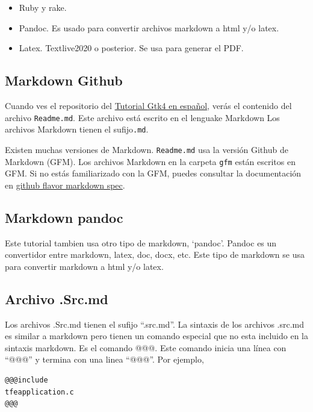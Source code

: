 \begin{itemize}
\tightlist
\item
  Ruby y rake.
\item
  Pandoc. Es usado para convertir archivos markdown a html y/o latex.
\item
  Latex. Textlive2020 o posterior. Se usa para generar el PDF.
\end{itemize}

\hypertarget{markdown-github}{%
\subsection{Markdown Github}\label{markdown-github}}

Cuando ves el repositorio del
\href{https://github.com/cjdg/Gtk4-tutorial-spanish}{Tutorial Gtk4 en
español}, verás el contenido del archivo \texttt{Readme.md}. Este
archivo está escrito en el lenguake Markdown Los archivos Markdown
tienen el sufijo\texttt{.md}.

Existen muchas versiones de Markdown. \texttt{Readme.md} usa la versión
Github de Markdown (GFM). Los archivos Markdown en la carpeta
\texttt{gfm} están escritos en GFM. Si no estás familiarizado con la
GFM, puedes consultar la documentación en
\href{https://github.github.com/gfm/}{github flavor markdown spec}.

\hypertarget{markdown-pandoc}{%
\subsection{Markdown pandoc}\label{markdown-pandoc}}

Este tutorial tambien usa otro tipo de markdown, `pandoc'. Pandoc es un
convertidor entre markdown, latex, doc, docx, etc. Este tipo de markdown
se usa para convertir markdown a html y/o latex.

\hypertarget{archivo-.src.md}{%
\subsection{Archivo .Src.md}\label{archivo-.src.md}}

Los archivos .Src.md tienen el sufijo ``.src.md''. La sintaxis de los
archivos .src.md es similar a markdown pero tienen un comando especial
que no esta incluido en la sintaxis markdown. Es el comando @@@. Este
comando inicia una línea con ``@@@'' y termina con una linea ``@@@''.
Por ejemplo,

\begin{verbatim}
@@@include
tfeapplication.c
@@@
\end{verbatim}

